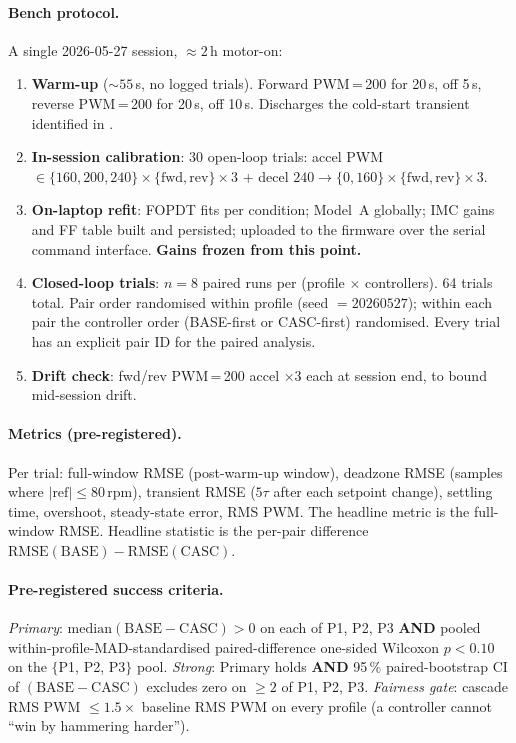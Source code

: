 \paragraph{Bench protocol.} A single 2026-05-27 session, ${\approx}2$\,h motor-on:
\begin{enumerate}
  \item \textbf{Warm-up} (${\sim}55$\,s, no logged trials). Forward PWM\,=\,200 for 20\,s, off 5\,s, reverse PWM\,=\,200 for 20\,s, off 10\,s. Discharges the cold-start transient identified in .
  \item \textbf{In-session calibration}: 30 open-loop trials: accel PWM~$\in \{160, 200, 240\} \times \{\text{fwd}, \text{rev}\} \times 3$ + decel $240 \to \{0, 160\} \times \{\text{fwd}, \text{rev}\} \times 3$.
  \item \textbf{On-laptop refit}: FOPDT fits per condition; Model~A globally; IMC gains and FF table built and persisted; uploaded to the firmware over the serial command interface. \textbf{Gains frozen from this point.}
  \item \textbf{Closed-loop trials}: $n=8$ paired runs per (profile $\times$ controllers). 64 trials total. Pair order randomised within profile (seed $= 20260527$); within each pair the controller order (BASE-first or CASC-first) randomised. Every trial has an explicit pair ID for the paired analysis.
  \item \textbf{Drift check}: fwd/rev PWM\,=\,200 accel $\times 3$ each at session end, to bound mid-session drift.
\end{enumerate}

\paragraph{Metrics (pre-registered).} Per trial: full-window RMSE (post-warm-up window), deadzone RMSE (samples where $|{\text{ref}}| \le 80$\,rpm), transient RMSE ($5\tau$ after each setpoint change), settling time, overshoot, steady-state error, RMS PWM. The headline metric is the full-window RMSE. Headline statistic is the per-pair difference $\mathrm{RMSE}(\text{BASE}) - \mathrm{RMSE}(\text{CASC})$.

\paragraph{Pre-registered success criteria.} \emph{Primary}: $\mathrm{median}(\text{BASE} - \text{CASC}) > 0$ on each of P1, P2, P3 \textbf{AND} pooled within-profile-MAD-standardised paired-difference one-sided Wilcoxon $p < 0.10$ on the $\{$P1, P2, P3$\}$ pool. \emph{Strong}: Primary holds \textbf{AND} 95\,\% paired-bootstrap CI of $(\text{BASE} - \text{CASC})$ excludes zero on $\ge 2$ of P1, P2, P3. \emph{Fairness gate}: cascade RMS PWM $\le 1.5 \times$ baseline RMS PWM on every profile (a controller cannot ``win by hammering harder'').

